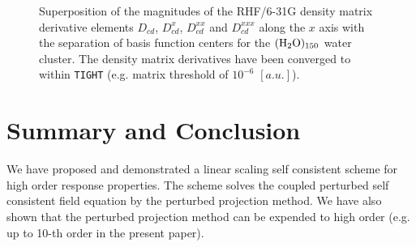 \documentclass[prl,aps,twocolumn,showpacs,twocolumngrid,superbib]{revtex4}
\begin{document}
\begin{figure}[t]
  \caption{\protect
    Superposition of the magnitudes of the RHF/6-31G density matrix
    derivative elements $D_{cd}$, $D^{x}_{cd}$, $D^{xx}_{cd}$ and $D^{xxx}_{cd}$
    along the $x$ axis with the separation of basis function centers
    for the $\rm (H_2O)_{150}$ water cluster. The density matrix 
    derivatives have been converged to within {\tt TIGHT} (e.g. 
    matrix threshold of $10^{-6}$ $[a.u.]$).
  }\label{fig:Superposition_Decay}
\end{figure}

\section{Summary and Conclusion}
 We have proposed and demonstrated a linear scaling self
 consistent scheme for high order response properties.
 The scheme solves the coupled perturbed self consistent field 
 equation by the perturbed projection method. We have also shown
 that the perturbed projection method can be expended to high
 order (e.g. up to 10-th order in the present paper).
\end{document}
